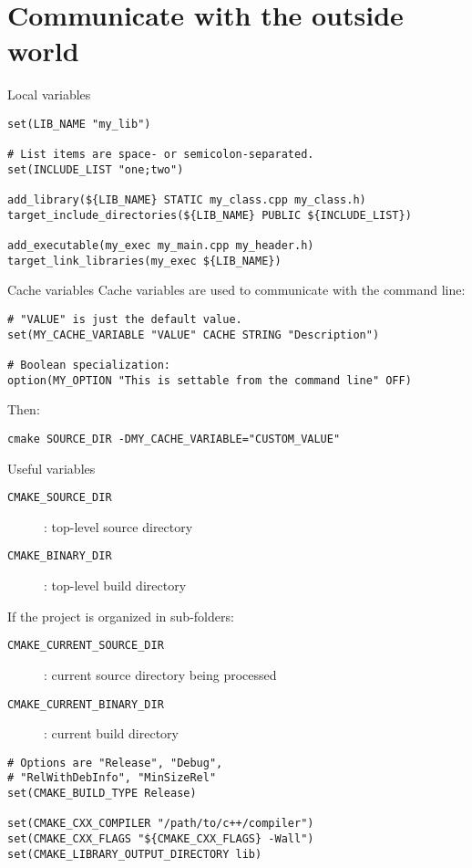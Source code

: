 \documentclass[aspectratio=169,11pt]{beamer}
\begin{document}
\section{Communicate with the outside world}
\begin{frame}[fragile]{Local variables}
\begin{verbatim}
set(LIB_NAME "my_lib")

# List items are space- or semicolon-separated.
set(INCLUDE_LIST "one;two")

add_library(${LIB_NAME} STATIC my_class.cpp my_class.h)
target_include_directories(${LIB_NAME} PUBLIC ${INCLUDE_LIST})

add_executable(my_exec my_main.cpp my_header.h)
target_link_libraries(my_exec ${LIB_NAME})
\end{verbatim}
\end{frame}

\begin{frame}[fragile]{Cache variables}
Cache variables are used to communicate with the command line:
\begin{verbatim}
# "VALUE" is just the default value.
set(MY_CACHE_VARIABLE "VALUE" CACHE STRING "Description")

# Boolean specialization:
option(MY_OPTION "This is settable from the command line" OFF)
\end{verbatim}

Then:
\begin{verbatim}
cmake SOURCE_DIR -DMY_CACHE_VARIABLE="CUSTOM_VALUE"
\end{verbatim}
\end{frame}

\begin{frame}[fragile]{Useful variables}
\begin{description}
    \item[\texttt{CMAKE\_SOURCE\_DIR}]: top-level source directory
    \item[\texttt{CMAKE\_BINARY\_DIR}]: top-level build directory
\end{description}
\vspace{0.4cm}
If the project is organized in sub-folders:
\begin{description}
    \item[\texttt{CMAKE\_CURRENT\_SOURCE\_DIR}]: current source directory being processed
    \item[\texttt{CMAKE\_CURRENT\_BINARY\_DIR}]: current build directory
\end{description}
\vspace{0.2cm}
\begin{verbatim}
# Options are "Release", "Debug",
# "RelWithDebInfo", "MinSizeRel"
set(CMAKE_BUILD_TYPE Release)

set(CMAKE_CXX_COMPILER "/path/to/c++/compiler")
set(CMAKE_CXX_FLAGS "${CMAKE_CXX_FLAGS} -Wall")
set(CMAKE_LIBRARY_OUTPUT_DIRECTORY lib)
\end{verbatim}
\end{frame}
\end{document}
